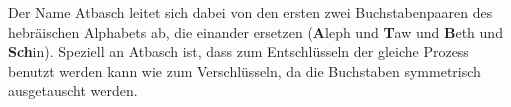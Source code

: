 \begin{table}[]
\centering
\caption{Tabula Recta der Atbasch-Verschlüsselung}
\label{tab:tabula-recta-atbasch}
\end{table}

Der Name Atbasch leitet sich dabei von den ersten zwei Buchstabenpaaren des hebräischen Alphabets ab, die einander ersetzen (\textbf{A}leph und \textbf{T}aw und \textbf{B}eth und \textbf{Sch}in). Speziell an Atbasch ist, dass zum Entschlüsseln der gleiche Prozess benutzt werden kann wie zum Verschlüsseln, da die Buchstaben symmetrisch ausgetauscht werden.


